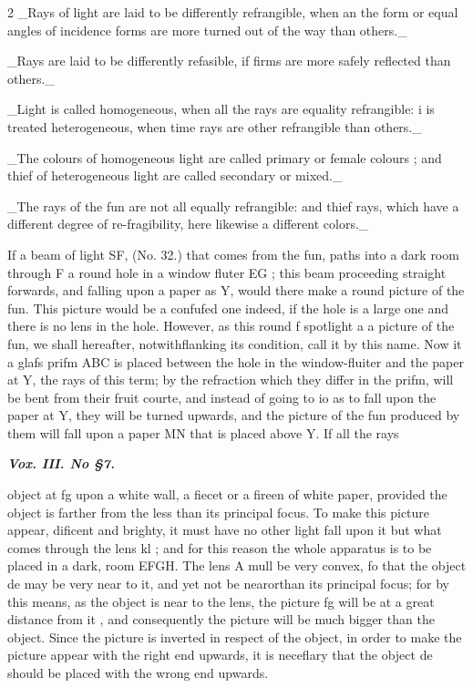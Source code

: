 \documentclass[10pt]{article}
\begin{document}
\begin{multicols}{2}
\_Rays of light are laid to be differently refrangible, when an the form or equal angles of incidence forms are more turned out of the way than others.\_

\_Rays are laid to be differently refasible, if firms are more safely reflected than others.\_

\_Light is called homogeneous, when all the rays are equality refrangible: i is treated heterogeneous, when time rays are other refrangible than others.\_

\_The colours of homogeneous light are called primary or female colours ; and thief of heterogeneous light are called secondary or mixed.\_

\_The rays of the fun are not all equally refrangible: and thief rays, which have a different degree of re-fragibility, here likewise a different colors.\_

If a beam of light SF, (No. 32.) that comes from the fun, paths into a dark room through F a round hole in a window fluter EG ; this beam proceeding straight forwards, and falling upon a paper as Y, would there make a round picture of the fun. This picture would be a confufed one indeed, if the hole is a large one and there is no lens in the hole. However, as this round f spotlight a a picture of the fun, we shall hereafter, notwithflanking its condition, call it by this name. Now it a glafs prifm ABC is placed between the hole in the window-fluiter and the paper at Y, the rays of this term; by the refraction which they differ in the prifm, will be bent from their fruit courte, and instead of going to io as to fall upon the paper at Y, they will be turned upwards, and the picture of the fun produced by them will fall upon a paper MN that is placed above Y. If all the rays

\begin{center}\small\itshape \textbf{Vox. III. No §7.}\end{center}
object at fg upon a white wall, a fiecet or a fireen of white paper, provided the object is farther from the less than its principal focus. To make this picture appear, dificent and brighty, it must have no other light fall upon it but what comes through the lens kl ; and for this reason the whole apparatus is to be placed in a dark, room EFGH. The lens A mull be very convex, fo that the object de may be very near to it, and yet not be nearorthan its principal focus; for by this means, as the object is near to the lens, the picture fg will be at a great distance from it , and consequently the picture will be much bigger than the object. Since the picture is inverted in respect of the object, in order to make the picture appear with the right end upwards, it is neceflary that the object de should be placed with the wrong end upwards.


\end{multicols}
\end{document}
